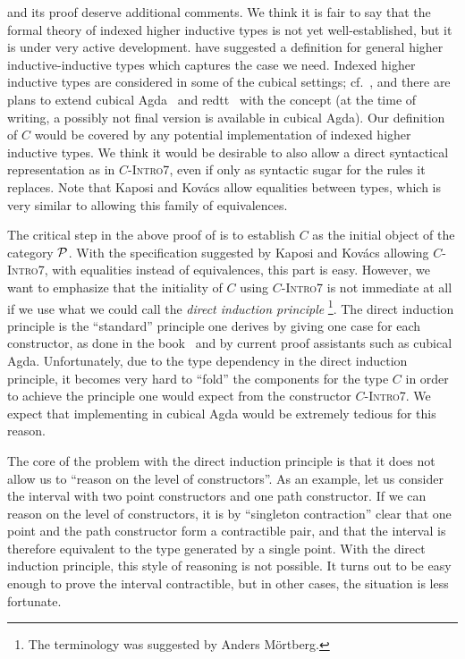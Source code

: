 \begin{remark} \label{rmk:paths-generalized-squid}
 and its proof 
deserve additional comments.
We think it is fair to say that the formal theory of indexed higher inductive
types is not yet well-established, but it is under very active development.
\citet{kaposi_et_al:LIPIcs:2018:9190,AAhiits} have
suggested a definition for general higher inductive-inductive types which captures
the case we need.
Indexed higher inductive types are considered in some of the cubical settings;
cf.\ \citet{cavallo2019higher}, and there are plans to extend
cubical Agda~\citep{andrea:cubicalagda,anders:cubicalblog,andreaAnders:experiments}
and redtt~\citep{redtt} with the concept (at the time of writing, a possibly not
final version is available in cubical Agda).
Our definition of $C$ would be covered by any potential implementation of
indexed higher inductive types.
We think it would be desirable to also allow a direct syntactical representation as
in
\textsc{$C$-Intro7}, even if only as syntactic sugar
for the rules it replaces.
Note that Kaposi and Kov{\'a}cs allow equalities between types,
which is very similar to allowing this family of equivalences.

The critical step in the above proof of  is to establish
$C$ as the initial object of the
category $\mathcal P$.
With the specification suggested by Kaposi and Kov{\'a}cs allowing
\textsc{$C$-Intro7}, with equalities instead of
equivalences, this part is easy.
However, we want to emphasize that the initiality of
$C$ using \textsc{$C$-Intro7}
is not immediate at all if we use what we could call the
\emph{direct induction principle}
\footnote{The terminology was suggested by Anders M\"ortberg.}.
The direct induction principle is the ``standard'' principle one derives by
giving one case for each constructor, as done in the book~
and by current proof assistants such as cubical Agda.
Unfortunately, due to the type dependency in the direct induction principle,
it becomes very hard to ``fold'' the components for the type
$C$ in order to achieve the principle one
would expect from the constructor \textsc{$C$-Intro7}.
We expect that implementing  in cubical Agda would be
extremely tedious for this reason.

The core of the problem with the direct induction principle is that it does not
allow us to ``reason on the level of constructors''.
As an example, let us consider the interval with two point constructors and one
path constructor.
If we can reason on the level of constructors, it is by ``singleton contraction''
clear that one point and the path constructor form a contractible pair, and that
the interval is therefore equivalent to the type generated by a single point.
With the direct induction principle, this style of reasoning is not possible.
It turns out to be easy enough to prove the interval contractible, but  in other
cases, the situation is less fortunate.


\end{remark}
